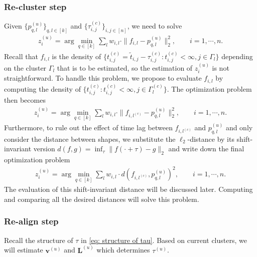 \subsubsection*{Re-cluster step}
Given $\{p_{q,l}^{(u)}\}_{q,l\in[k]}$ and $\{\tau^{(c)}_{i,j}\}_{i,j\in[n]}$,
we need to solve 
\begin{align*}
z_i^{(u)} 
=
\arg\min_{q\in[k]} \sum_{l} w_{i,l} \cdot \|f_{i,l} - p^{(u)}_{q,l} \|_2^2, \qquad i=1,\cdots,n .
\end{align*}
Recall that $f_{i,l} $ is the density of $\{t_{i,j}^{(c)}=\tilde t_{i,j}-\tau_{i,j}^{(c)} : t_{i,j}^{(c)}<\infty, {j\in\Gamma_l\}}$ depending on the cluster $\Gamma_l$ that is to be estimated, so the estimation of $z_i^{(u)}$ is not straightforward. 
To handle this problem, we propose to evaluate $f_{i,l} $ by computing the density of $\{t_{i,j}^{(c)}: t_{i,j}^{(c)}<\infty, {j\in\Gamma_l^{(c)}\}}$.
The optimization problem then becomes
\begin{align*}
z_i^{(u)} 
=
\arg\min_{q\in[k]} \sum_{l} w_{i,l} \cdot \|f_{i,l^{(c)}} - p^{(u)}_{q,l} \|_2^2, \qquad i=1,\cdots,n .
\end{align*}
Furthermore, to rule out the effect of time lag between $f_{i,l^{(c)}}$ and $p^{(u)}_{q,l} $ and only consider the distance between shapes, 
we substitute the $\ell_2$-distance by its shift-invariant version $d(f, g) = \inf_\tau \|f(\cdot+\tau)-g\|_2 $ and write down the final optimization problem
\begin{align}
z_i^{(u)} 
=
\arg\min_{q\in[k]} \sum_{l} w_{i,l} \cdot d(f_{i,l^{(c)}}, p^{(u)}_{q,l})^2, \qquad i=1,\cdots,n .
\label{eq: update clusters}
\end{align}
The evaluation of this shift-invariant distance will be discussed later.
Computing and comparing all the desired distances will solve this problem.




\subsubsection*{Re-align step}
Recall the structure of $\tau$ in \eqref{eq: structure of tau}. 
Based on current clusters, we will estimate $\mathbf{v }^{(u)}$ and $\mathbf{L}^{(u)}$ which determines $\tau^{(u)}$.

